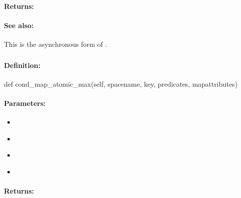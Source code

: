 \paragraph{Returns:}


\paragraph{See also:}  This is the asynchronous form of .

\pagebreak
\subsubsection{}
\label{api:python:cond_map_atomic_max}


\paragraph{Definition:}
\begin{pythoncode}
def cond_map_atomic_max(self, spacename, key, predicates, mapattributes)
\end{pythoncode}

\paragraph{Parameters:}
\begin{itemize}[noitemsep]
\item {}\\

\item {}\\

\item {}\\

\item {}\\

\end{itemize}

\paragraph{Returns:}


